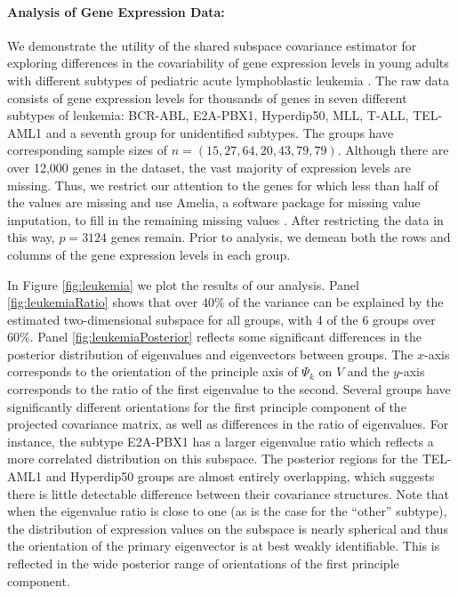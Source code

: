 \documentclass[12pt]{article}
\begin{document}
\paragraph{Analysis of Gene Expression Data:}

We demonstrate the utility of the shared subspace covariance
estimator for exploring differences in the covariability of gene
expression levels in young adults with different subtypes of pediatric
acute lymphoblastic leukemia \citep{Yeoh2002}.  The raw data consists
of gene expression levels for thousands of genes in seven different
subtypes of leukemia: BCR-ABL, E2A-PBX1, Hyperdip50, MLL, T-ALL,
TEL-AML1 and a seventh group for unidentified subtypes.  The groups
have corresponding sample sizes of $n = (15, 27, 64, 20, 43, 79, 79)$.
Although there are over 12,000 genes in the dataset, the vast majority of expression
levels are missing.  Thus, we restrict our attention to the genes for
which less than half of the values are missing and use Amelia, a
software package for missing value imputation, to fill in the
remaining missing values \citep{Amelia}.  After restricting the data
in this way, $p=3124$ genes remain.  Prior to analysis, we demean both
the rows and columns of the gene expression levels in each group.

In Figure \ref{fig:leukemia} we plot the results of our analysis.
Panel \ref{fig:leukemiaRatio} shows that over $40\%$ of the variance
can be explained by the estimated two-dimensional subspace for all
groups, with 4 of the 6 groups over 60\%.  Panel
\ref{fig:leukemiaPosterior} reflects some significant differences in
the posterior distribution of eigenvalues and eigenvectors between
groups.  The $x$-axis corresponds to the orientation of the principle
axis of $\Psi_k$ on $V$ and the $y$-axis corresponds to the ratio of
the first eigenvalue to the second.  Several groups have significantly
different orientations for the first principle component of the
projected covariance matrix, as well as differences in the ratio of
eigenvalues.  For instance, the subtype E2A-PBX1 has a larger
eigenvalue ratio which reflects a more correlated distribution on this
subspace.  The posterior regions for the TEL-AML1 and Hyperdip50
groups are almost entirely overlapping, which suggests there is little
detectable difference between their covariance structures.  Note that
when the eigenvalue ratio is close to one (as is the case for the
``other'' subtype), the distribution of expression values on the
subspace is nearly spherical and thus the orientation of the primary
eigenvector is at best weakly identifiable.  This is reflected in the
wide posterior range of orientations of the first principle component.
\end{document}
